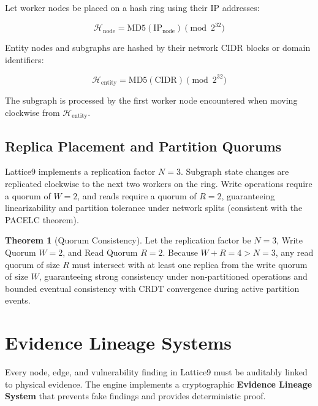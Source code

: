 \documentclass[11pt,a4paper]{article}
\theoremstyle{definition}
\newtheorem{theorem}{Theorem}[section]
\numberwithin{equation}{section}
\newcommand{\set}[1]{\mathcal{#1}}
\begin{document}
Let worker nodes be placed on a hash ring using their IP addresses:

\begin{equation}\label{eq:hash-node}
\set{H}_{\text{node}} = \text{MD5}(\text{IP}_{\text{node}}) \pmod{2^{32}}
\end{equation}

Entity nodes and subgraphs are hashed by their network CIDR blocks or domain identifiers:

\begin{equation}\label{eq:hash-entity}
\set{H}_{\text{entity}} = \text{MD5}(\text{CIDR}) \pmod{2^{32}}
\end{equation}

The subgraph is processed by the first worker node encountered when moving clockwise from $\set{H}_{\text{entity}}$.

\subsection{Replica Placement and Partition Quorums}\label{subsec:quorums}

Lattice9 implements a replication factor $N=3$. Subgraph state changes are replicated clockwise to the next two workers on the ring. Write operations require a quorum of $W=2$, and reads require a quorum of $R=2$, guaranteeing linearizability and partition tolerance under network splits (consistent with the PACELC theorem).

\begin{theorem}[Quorum Consistency]\label{thm:quorum}
Let the replication factor be $N=3$, Write Quorum $W=2$, and Read Quorum $R=2$. Because $W + R = 4 > N = 3$, any read quorum of size $R$ must intersect with at least one replica from the write quorum of size $W$, guaranteeing strong consistency under non-partitioned operations and bounded eventual consistency with CRDT convergence during active partition events.
\end{theorem}

\section{Evidence Lineage Systems}\label{sec:evidence}

Every node, edge, and vulnerability finding in Lattice9 must be auditably linked to physical evidence. The engine implements a cryptographic \textbf{Evidence Lineage System} that prevents fake findings and provides deterministic proof.
\end{document}
